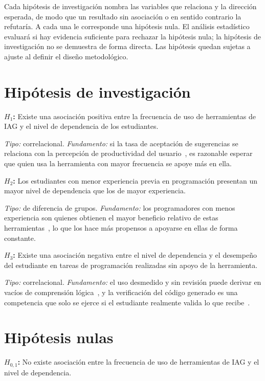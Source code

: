 \documentclass[12pt,a4paper,oneside]{report}
\begin{document}
Cada hipótesis de investigación nombra las variables que relaciona y la dirección esperada, de modo que un resultado sin asociación o en sentido contrario la refutaría. A cada una le corresponde una hipótesis nula. El análisis estadístico evaluará si hay evidencia suficiente para rechazar la hipótesis nula; la hipótesis de investigación no se demuestra de forma directa. Las hipótesis quedan sujetas a ajuste al definir el diseño metodológico.

\section{Hipótesis de investigación}

\textbf{$H_1$:} Existe una asociación positiva entre la frecuencia de uso de herramientas de IAG y el nivel de dependencia de los estudiantes.

\textit{Tipo:} correlacional. \textit{Fundamento:} si la tasa de aceptación de sugerencias se relaciona con la percepción de productividad del usuario~\cite{ziegler2022}, es razonable esperar que quien usa la herramienta con mayor frecuencia se apoye más en ella.

\textbf{$H_2$:} Los estudiantes con menor experiencia previa en programación presentan un mayor nivel de dependencia que los de mayor experiencia.

\textit{Tipo:} de diferencia de grupos. \textit{Fundamento:} los programadores con menos experiencia son quienes obtienen el mayor beneficio relativo de estas herramientas~\cite{peng2023}, lo que los hace más propensos a apoyarse en ellas de forma constante.

\textbf{$H_3$:} Existe una asociación negativa entre el nivel de dependencia y el desempeño del estudiante en tareas de programación realizadas sin apoyo de la herramienta.

\textit{Tipo:} correlacional. \textit{Fundamento:} el uso desmedido y sin revisión puede derivar en vacíos de comprensión lógica~\cite{martinovic2024}, y la verificación del código generado es una competencia que solo se ejerce si el estudiante realmente valida lo que recibe~\cite{prather2023,ieee2024}.

\section{Hipótesis nulas}

\textbf{$H_{0,1}$:} No existe asociación entre la frecuencia de uso de herramientas de IAG y el nivel de dependencia.
\end{document}
